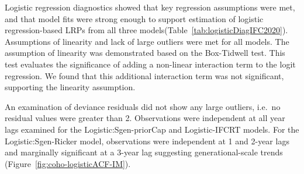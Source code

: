 \documentclass[11pt]{book}
\begin{document}
Logistic regression diagnostics showed that key regression assumptions were met, and that model fits were strong enough to support estimation of logistic regression-based LRPs from all three models(Table~\ref{tab:logisticDiagIFC2020}). Assumptions of linearity and lack of large outliers were met for all models. The assumption of linearity was demonstrated based on the Box-Tidwell test. This test evaluates the significance of adding a non-linear interaction term to the logit regression. We found that this additional interaction term was not significant, supporting the linearity assumption.

An examination of deviance residuals did not show any large outliers, i.e.~no residual values were greater than 2. Observations were independent at all year lags examined for the Logistic:Sgen-priorCap and Logistic-IFCRT models. For the Logistic:Sgen-Ricker model, observations were independent at 1 and 2-year lags and marginally significant at a 3-year lag suggesting generational-scale trends (Figure~\ref{fig:coho-logisticACF-IM}).
\end{document}
